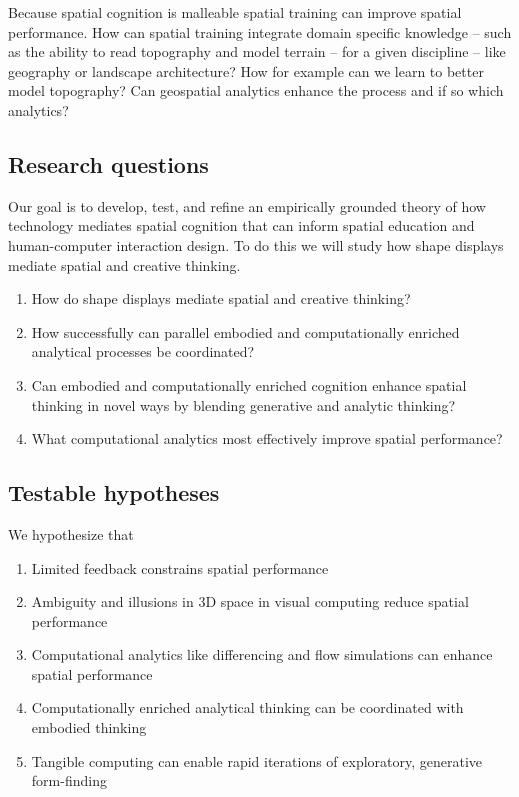 \documentclass{article}
\begin{document}
Because spatial cognition is malleable
spatial training can improve spatial performance. 
How can spatial training integrate domain specific knowledge -- such as the ability to read topography and model terrain -- for a given discipline -- like geography or landscape architecture? 
How for example can we learn to better model topography? 
Can geospatial analytics enhance the process and if so which analytics?

\clearpage

\subsection*{Research questions}
Our goal is to develop, test, and refine an empirically grounded theory of
how technology mediates spatial cognition that can inform spatial education and human-computer interaction design. 
To do this we will study how shape displays mediate spatial and creative thinking.

\begin{enumerate}
\item How do shape displays mediate spatial and creative thinking?
\item How successfully can parallel embodied and computationally enriched analytical processes be coordinated? 
\item Can embodied and computationally enriched cognition enhance spatial thinking in novel ways 
by blending generative and analytic thinking? 
\item What computational analytics most effectively improve spatial performance?
\end{enumerate}

\subsection*{Testable hypotheses}
We hypothesize that
\begin{enumerate}
	\item Limited feedback constrains spatial performance
	\item Ambiguity and illusions in 3D space in visual computing reduce spatial performance 
	\item Computational analytics like differencing and flow simulations can enhance spatial performance 
	\item Computationally enriched analytical thinking can be coordinated with embodied thinking 
	\item Tangible computing can enable rapid iterations of exploratory, generative form-finding
\end{enumerate}
\end{document}
